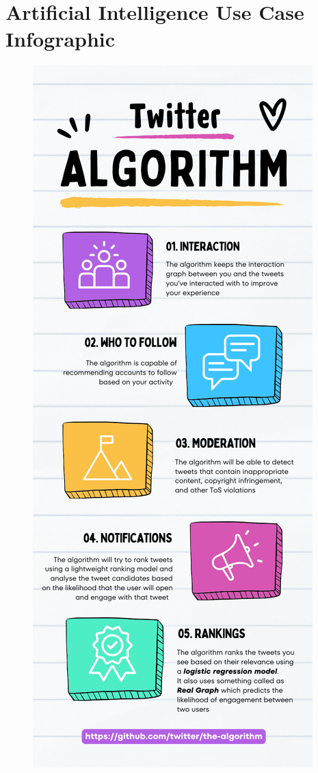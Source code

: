 \documentclass[12pt,titlepage]{article}
\begin{document}
\pagebreak

\section{Artificial Intelligence Use Case Infographic}
\begin{figure}[h]
    \centering
    \includegraphics[height=0.6\pdfpageheight]{./images/twitter-algorithm-infographic.png}
\end{figure}
\end{document}
